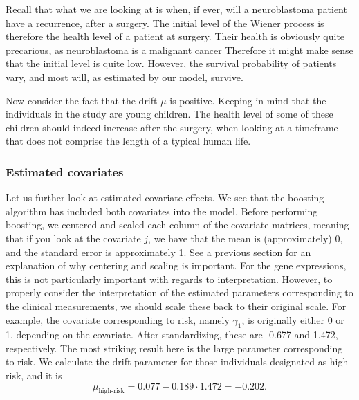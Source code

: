 Recall that what we are looking at is when, if ever, will a neuroblastoma patient have a recurrence, after a surgery.
The initial level of the Wiener process is therefore the health level of a patient at surgery.
Their health is obviously quite precarious, as neuroblastoma is a malignant cancer
Therefore it might make sense that the initial level is quite low.
However, the survival probability of patients vary, and most will, as estimated by our model, survive.

Now consider the fact that the drift $\mu$ is positive.
Keeping in mind that the individuals in the study are young children.
The health level of some of these children should indeed increase after the surgery, when looking at a timeframe that does not comprise the length of a typical human life.

\subsubsection{Estimated covariates}
Let us further look at estimated covariate effects.
We see that the boosting algorithm has included both covariates into the model.
Before performing boosting, we centered and scaled each column of the covariate matrices, meaning that if you look at the covariate $j$, we have that the mean is (approximately) 0,
and the standard error is approximately 1.
See a previous section for an explanation of why centering and scaling is important.
For the gene expressions, this is not particularly important with regards to interpretation.
However, to properly consider the interpretation of the estimated parameters corresponding to the clinical measurements, we should
scale these back to their original scale.
For example, the covariate corresponding to risk, namely $\gamma_1$, is originally either 0 or 1, depending on the covariate.
After standardizing, these are -0.677 and 1.472, respectively.
The most striking result here is the large parameter corresponding to risk.
We calculate the drift parameter for those individuals designated as high-risk, and it is
\begin{equation}
    \mu_{\text{high-risk}}=0.077-0.189\cdot1.472=-0.202.
\end{equation}
